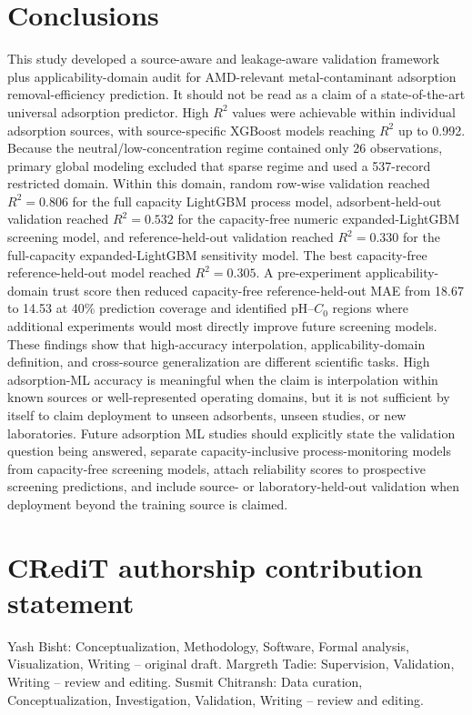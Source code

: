 \documentclass[review,12pt,number]{elsarticle}
\begin{document}
\section{Conclusions}

This study developed a source-aware and leakage-aware validation framework plus applicability-domain audit for AMD-relevant metal-contaminant adsorption removal-efficiency prediction. It should not be read as a claim of a state-of-the-art universal adsorption predictor. High $R^2$ values were achievable within individual adsorption sources, with source-specific XGBoost models reaching $R^2$ up to 0.992. Because the neutral/low-concentration regime contained only 26 observations, primary global modeling excluded that sparse regime and used a 537-record restricted domain. Within this domain, random row-wise validation reached $R^2 = 0.806$ for the full capacity LightGBM process model, adsorbent-held-out validation reached $R^2 = 0.532$ for the capacity-free numeric expanded-LightGBM screening model, and reference-held-out validation reached $R^2 = 0.330$ for the full-capacity expanded-LightGBM sensitivity model. The best capacity-free reference-held-out model reached $R^2 = 0.305$. A pre-experiment applicability-domain trust score then reduced capacity-free reference-held-out MAE from 18.67 to 14.53 at 40\% prediction coverage and identified pH--$C_0$ regions where additional experiments would most directly improve future screening models. These findings show that high-accuracy interpolation, applicability-domain definition, and cross-source generalization are different scientific tasks. High adsorption-ML accuracy is meaningful when the claim is interpolation within known sources or well-represented operating domains, but it is not sufficient by itself to claim deployment to unseen adsorbents, unseen studies, or new laboratories. Future adsorption ML studies should explicitly state the validation question being answered, separate capacity-inclusive process-monitoring models from capacity-free screening models, attach reliability scores to prospective screening predictions, and include source- or laboratory-held-out validation when deployment beyond the training source is claimed.

\section*{CRediT authorship contribution statement}

Yash Bisht: Conceptualization, Methodology, Software, Formal analysis, Visualization, Writing -- original draft. Margreth Tadie: Supervision, Validation, Writing -- review and editing. Susmit Chitransh: Data curation, Conceptualization, Investigation, Validation, Writing -- review and editing.
\end{document}
